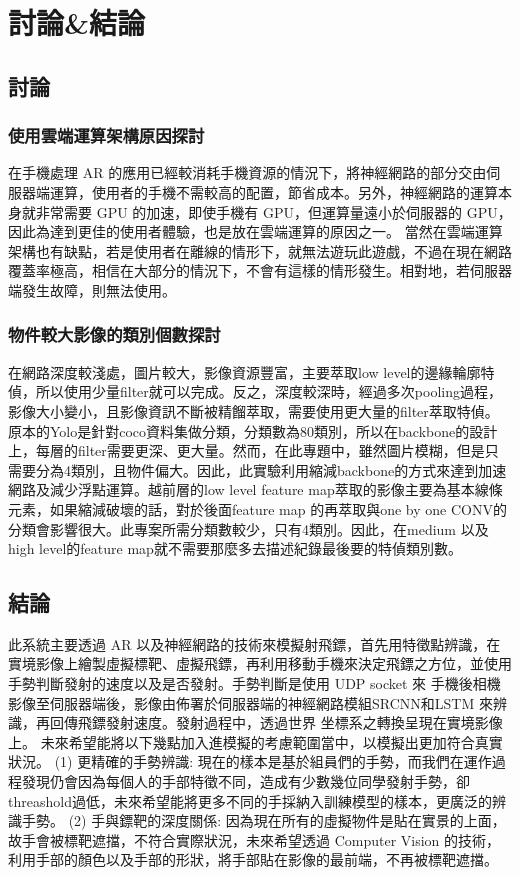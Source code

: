 \chapter{討論\&結論}
\section{討論}
\subsection{使用雲端運算架構原因探討}
在手機處理 AR 的應用已經較消耗手機資源的情況下，將神經網路的部分交由伺服器端運算，使用者的手機不需較高的配置，節省成本。另外，神經網路的運算本身就非常需要 GPU 的加速，即使手機有 GPU，但運算量遠小於伺服器的 GPU，因此為達到更佳的使用者體驗，也是放在雲端運算的原因之一。
當然在雲端運算架構也有缺點，若是使用者在離線的情形下，就無法遊玩此遊戲，不過在現在網路覆蓋率極高，相信在大部分的情況下，不會有這樣的情形發生。相對地，若伺服器端發生故障，則無法使用。
\subsection{物件較大影像的類別個數探討}
在網路深度較淺處，圖片較大，影像資源豐富，主要萃取low level的邊緣輪廓特偵，所以使用少量filter就可以完成。反之，深度較深時，經過多次pooling過程，影像大小變小，且影像資訊不斷被精餾萃取，需要使用更大量的filter萃取特偵。原本的Yolo是針對coco資料集做分類，分類數為80類別，所以在backbone的設計上，每層的filter需要更深、更大量。然而，在此專題中，雖然圖片模糊，但是只需要分為4類別，且物件偏大。因此，此實驗利用縮減backbone的方式來達到加速網路及減少浮點運算。越前層的low level feature map萃取的影像主要為基本線條元素，如果縮減破壞的話，對於後面feature map 的再萃取與one by one CONV的分類會影響很大。此專案所需分類數較少，只有4類別。因此，在medium 以及high level的feature map就不需要那麼多去描述紀錄最後要的特偵類別數。

\section{結論}
此系統主要透過 AR 以及神經網路的技術來模擬射飛鏢，首先用特徵點辨識，在實境影像上繪製虛擬標靶、虛擬飛鏢，再利用移動手機來決定飛鏢之方位，並使用手勢判斷發射的速度以及是否發射。手勢判斷是使用 UDP socket 來
手機後相機影像至伺服器端後，影像由佈署於伺服器端的神經網路模組SRCNN和LSTM 來辨識，再回傳飛鏢發射速度。發射過程中，透過世界
坐標系之轉換呈現在實境影像上。
未來希望能將以下幾點加入進模擬的考慮範圍當中，以模擬出更加符合真實狀況。
(1) 更精確的手勢辨識: 現在的樣本是基於組員們的手勢，而我們在運作過程發現仍會因為每個人的手部特徵不同，造成有少數幾位同學發射手勢，卻threashold過低，未來希望能將更多不同的手採納入訓練模型的樣本，更廣泛的辨識手勢。
(2) 手與鏢靶的深度關係: 因為現在所有的虛擬物件是貼在實景的上面，故手會被標靶遮擋，不符合實際狀況，未來希望透過 Computer Vision 的技術，利用手部的顏色以及手部的形狀，將手部貼在影像的最前端，不再被標靶遮擋。
